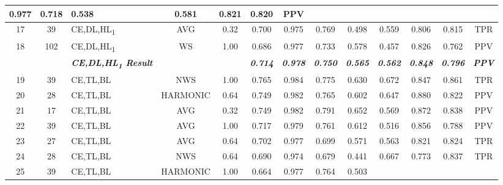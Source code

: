 \begin{table}[H]
{\begin{tabular}{cc|l|cc|c|c|c|c|c|c|c|c|}
    0.977 &
    0.718 &
    0.538 &
    0.581 &
    0.821 &
    0.820 &
    PPV \\ \hline
  \multicolumn{1}{|c|}{17} &
    39 &
    CE,DL,HL\textsubscript{1} &
    \multicolumn{1}{c|}{AVG} &
    0.32 &
    0.700 &
    0.975 &
    0.769 &
    0.498 &
    0.559 &
    0.806 &
    0.815 &
    TPR \\ \hline
  \multicolumn{1}{|c|}{18} &
    102 &
    CE,DL,HL\textsubscript{1} &
    \multicolumn{1}{c|}{WS} &
    1.00 &
    0.686 &
    0.977 &
    0.733 &
    0.578 &
    0.457 &
    0.826 &
    0.762 &
    PPV \\ \hline
   &
    \textit{\textbf{}} &
    \textit{\textbf{CE,DL,HL\textsubscript{1} Result}} &
     &
     &
    \textit{\textbf{0.714}} &
    \textit{\textbf{0.978}} &
    \textit{\textbf{0.750}} &
    \textit{\textbf{0.565}} &
    \textit{\textbf{0.562}} &
    \textit{\textbf{0.848}} &
    \textit{\textbf{0.796}} &
    \textit{\textbf{PPV}} \\ \hline
  \multicolumn{1}{|c|}{19} &
    39 &
    CE,TL,BL &
    \multicolumn{1}{c|}{NWS} &
    1.00 &
    0.765 &
    0.984 &
    0.775 &
    0.630 &
    0.672 &
    0.847 &
    0.861 &
    TPR \\ \hline
  \multicolumn{1}{|c|}{20} &
    28 &
    CE,TL,BL &
    \multicolumn{1}{c|}{HARMONIC} &
    0.64 &
    0.749 &
    0.982 &
    0.765 &
    0.602 &
    0.647 &
    0.880 &
    0.822 &
    PPV \\ \hline
  \multicolumn{1}{|c|}{21} &
    17 &
    CE,TL,BL &
    \multicolumn{1}{c|}{AVG} &
    0.32 &
    0.749 &
    0.982 &
    0.791 &
    0.652 &
    0.569 &
    0.872 &
    0.838 &
    PPV \\ \hline
  \multicolumn{1}{|c|}{22} &
    39 &
    CE,TL,BL &
    \multicolumn{1}{c|}{AVG} &
    1.00 &
    0.717 &
    0.979 &
    0.761 &
    0.612 &
    0.516 &
    0.856 &
    0.788 &
    PPV \\ \hline
  \multicolumn{1}{|c|}{23} &
    27 &
    CE,TL,BL &
    \multicolumn{1}{c|}{AVG} &
    0.64 &
    0.702 &
    0.977 &
    0.699 &
    0.571 &
    0.563 &
    0.821 &
    0.824 &
    TPR \\ \hline
  \multicolumn{1}{|c|}{24} &
    28 &
    CE,TL,BL &
    \multicolumn{1}{c|}{NWS} &
    0.64 &
    0.690 &
    0.974 &
    0.679 &
    0.441 &
    0.667 &
    0.773 &
    0.837 &
    TPR \\ \hline
  \multicolumn{1}{|c|}{25} &
    39 &
    CE,TL,BL &
    \multicolumn{1}{c|}{HARMONIC} &
    1.00 &
    0.664 &
    0.977 &
    0.764 &
    0.503 &

\end{tabular}}
\end{table}
